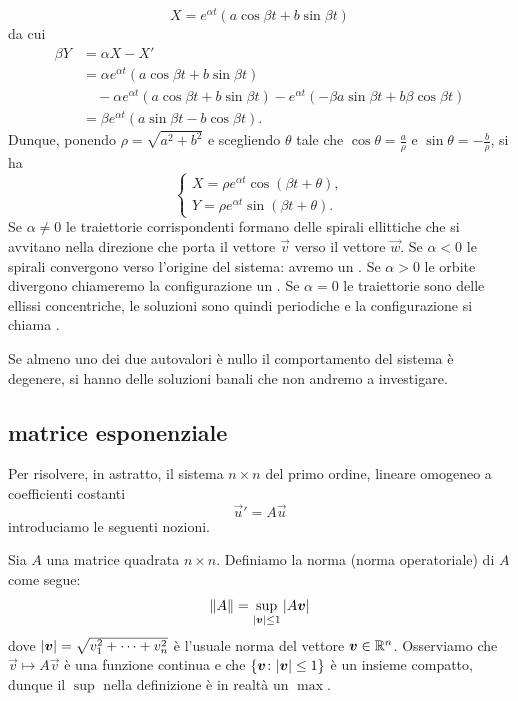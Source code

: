 \[
X = e^{\alpha t}(a \cos \beta t + b \sin \beta t)
\]
da cui
\begin{align*}
\beta Y
&= \alpha X - X'\\
& = \alpha e^{\alpha t}(a \cos \beta t + b \sin \beta t) \\
&\quad - \alpha e^{\alpha t}(a\cos \beta t + b \sin \beta t)
  - e^{\alpha t}(-\beta a \sin \beta t + b \beta \cos \beta t) \\
 &= \beta e^{\alpha t}(a\sin \beta t - b \cos \beta t).
\end{align*}
Dunque, ponendo $\rho=\sqrt{a^2+b^2}$ e scegliendo $\theta$
tale che $\cos \theta = \frac a \rho$ e $\sin \theta = - \frac b \rho$,
si ha
\[
  \begin{cases}
   X = \rho e^{\alpha t} \cos(\beta t + \theta),\\
   Y = \rho e^{\alpha t} \sin(\beta t + \theta).
  \end{cases}
\]
Se $\alpha \neq 0$ le traiettorie corrispondenti formano delle spirali
ellittiche che si avvitano nella direzione che porta il vettore $\vec v$ verso
il vettore $\vec w$. Se $\alpha < 0$ le spirali convergono verso l'origine del
sistema: avremo un . Se $\alpha >0$ le orbite
divergono chiameremo la configurazione un .
Se $\alpha = 0$ le traiettorie sono delle ellissi concentriche,
le soluzioni sono quindi periodiche e la configurazione
si chiama .

Se almeno uno dei due autovalori è nullo il comportamento del sistema è degenere,
si hanno delle soluzioni banali che non andremo a investigare.

\subsection{matrice esponenziale}

Per risolvere, in astratto, il sistema $n\times n$ del primo ordine, 
lineare omogeneo a coefficienti costanti
\[
  \vec u' = A \vec u
\]
introduciamo le seguenti nozioni.

Sia $A$ una matrice quadrata $n\times n$. Definiamo la norma (norma
operatoriale) di $A$ come segue:
\[
  {\left\Vert  A \right\Vert} = \sup_{{\left|\boldsymbol v\right|} \le 1} {\left|A\boldsymbol v\right|}
\]
dove ${\left| \boldsymbol v\right|} = \sqrt{v_1^2+ \dots + v_n^2}$ è l'usuale norma del
vettore $\boldsymbol v\in \mathbb R^n$.
Osserviamo che $\vec v\mapsto A\vec v$ è una funzione
continua e che ${\left\{ \boldsymbol v\colon {\left| \boldsymbol v\right|} \le 1 \right\}}$ è un insieme
compatto, dunque il $\sup$ nella definizione è in realtà un $\max$.

